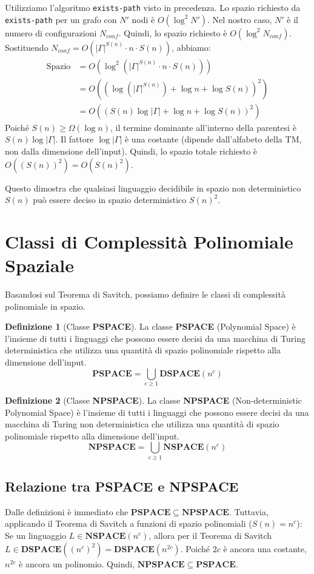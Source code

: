 \documentclass[a4paper]{article}
\theoremstyle{definition} %
\newtheorem{definition}{Definizione}
\begin{document}
\begin{enumerate}
    Utilizziamo l'algoritmo \texttt{exists-path} visto in precedenza. Lo spazio richiesto da \texttt{exists-path} per un grafo con $N'$ nodi è $O(\log^2 N')$.
    Nel nostro caso, $N'$ è il numero di configurazioni $N_{conf}$.
    Quindi, lo spazio richiesto è $O(\log^2 N_{conf})$.
    Sostituendo $N_{conf} = O(|\Gamma|^{S(n)} \cdot n \cdot S(n))$, abbiamo:
    \begin{align*} \text{Spazio} &= O(\log^2 (|\Gamma|^{S(n)} \cdot n \cdot S(n))) \\ &= O((\log (|\Gamma|^{S(n)}) + \log n + \log S(n))^2) \\ &= O((S(n)\log|\Gamma| + \log n + \log S(n))^2)\end{align*}
    Poiché $S(n) \ge \Omega(\log n)$, il termine dominante all'interno della parentesi è $S(n)\log|\Gamma|$.
    Il fattore $\log|\Gamma|$ è una costante (dipende dall'alfabeto della TM, non dalla dimensione dell'input).
    Quindi, lo spazio totale richiesto è $O((S(n))^2) = O(S(n)^2)$.
\end{enumerate}
Questo dimostra che qualsiasi linguaggio decidibile in spazio non deterministico $S(n)$ può essere deciso in spazio deterministico $S(n)^2$.

\section{Classi di Complessità Polinomiale Spaziale}
Basandosi sul Teorema di Savitch, possiamo definire le classi di complessità polinomiale in spazio.

\begin{definition}[Classe \textbf{PSPACE}]
La classe \textbf{PSPACE} (Polynomial Space) è l'insieme di tutti i linguaggi che possono essere decisi da una macchina di Turing deterministica che utilizza una quantità di spazio polinomiale rispetto alla dimensione dell'input.
\[ \mathbf{PSPACE} = \bigcup_{c \ge 1} \mathbf{DSPACE}(n^c) \]
\end{definition}

\begin{definition}[Classe \textbf{NPSPACE}]
La classe \textbf{NPSPACE} (Non-deterministic Polynomial Space) è l'insieme di tutti i linguaggi che possono essere decisi da una macchina di Turing non deterministica che utilizza una quantità di spazio polinomiale rispetto alla dimensione dell'input.
\[ \mathbf{NPSPACE} = \bigcup_{c \ge 1} \mathbf{NSPACE}(n^c) \]
\end{definition}

\subsection{Relazione tra PSPACE e NPSPACE}
Dalle definizioni è immediato che $\mathbf{PSPACE} \subseteq \mathbf{NPSPACE}$.
Tuttavia, applicando il Teorema di Savitch a funzioni di spazio polinomiali ($S(n) = n^c$):
Se un linguaggio $L \in \mathbf{NSPACE}(n^c)$, allora per il Teorema di Savitch $L \in \mathbf{DSPACE}((n^c)^2) = \mathbf{DSPACE}(n^{2c})$. Poiché $2c$ è ancora una costante, $n^{2c}$ è ancora un polinomio.
Quindi, $\mathbf{NPSPACE} \subseteq \mathbf{PSPACE}$.
\end{document}
